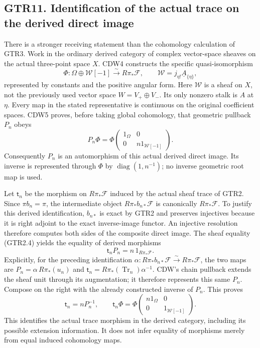 \subsection{GTR11. Identification of the actual trace on the derived
direct
image}\label{gtr11.-identification-of-the-actual-trace-on-the-derived-direct-image}

There is a stronger receiving statement than the cohomology calculation
of GTR3. Work in the ordinary derived category of complex vector-space
sheaves on the actual three-point space \(X\). CDW4 constructs the
specific quasi-isomorphism \[
\Phi:\Omega\oplus\mathscr W[-1]\xrightarrow{\sim}R\pi_*\mathscr F,
\qquad \mathscr W=j_{\eta!}\underline A_{\{\eta\}},
\tag{GTR11.1}
\] represented by constants and the positive angular form. Here
\(\mathscr W\) is a sheaf on \(X\), not the previously used vector space
\(W=V_+\oplus V_-\). Its only nonzero stalk is \(A\) at \(\eta\). Every
map in the stated representative is continuous on the original
coefficient spaces. CDW5 proves, before taking global cohomology, that
geometric pullback \(P_n\) obeys \[
P_n\Phi=\Phi\begin{pmatrix}1_{\Omega}&0\\0&n1_{\mathscr W[-1]}\end{pmatrix}.
\tag{GTR11.2}
\] Consequently \(P_n\) is an automorphism of this actual derived direct
image. Its inverse is represented through \(\Phi\) by
\(\operatorname{diag}(1,n^{-1})\); no inverse geometric root map is
used.

Let \(\mathsf t_n\) be the morphism on \(R\pi_*\mathscr F\) induced by
the actual sheaf trace of GTR2. Since \(\pi b_n=\pi\), the intermediate
object \(R\pi_*b_{n*}\mathscr F\) is canonically \(R\pi_*\mathscr F\).
To justify this derived identification, \(b_{n*}\) is exact by GTR2 and
preserves injectives because it is right adjoint to the exact
inverse-image functor. An injective resolution therefore computes both
sides of the composite direct image. The sheaf equality (GTR2.4) yields
the equality of derived morphisms \[
\mathsf t_nP_n=n\,1_{R\pi_*\mathscr F}.
\tag{GTR11.3}
\] Explicitly, for the preceding identification
\(\alpha:R\pi_*b_{n*}\mathscr F\xrightarrow{\sim}R\pi_*\mathscr F\), the
two maps are \(P_n=\alpha\,R\pi_*(u_n)\) and
\(\mathsf t_n=R\pi_*(\operatorname{Tr}_n)\alpha^{-1}\). CDW's chain
pullback extends the sheaf unit through its augmentation; it therefore
represents this same \(P_n\). Compose on the right with the already
constructed inverse of \(P_n\). This proves \[
\boxed{
\mathsf t_n=nP_n^{-1},\qquad
\mathsf t_n\Phi
=\Phi\begin{pmatrix}n1_{\Omega}&0\\0&1_{\mathscr W[-1]}\end{pmatrix}.}
\tag{GTR11.4}
\] This identifies the actual trace morphism in the derived category,
including its possible extension information. It does not infer equality
of morphisms merely from equal induced cohomology maps.

